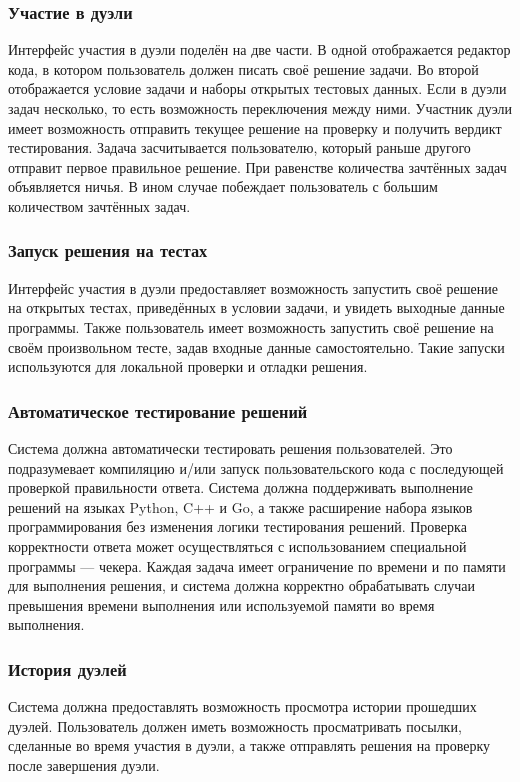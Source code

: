 \subsubsection*{Участие в дуэли}
Интерфейс участия в дуэли поделён на две части.
В одной отображается редактор кода, в котором пользователь должен писать своё решение задачи.
Во второй отображается условие задачи и наборы открытых тестовых данных.
Если в дуэли задач несколько, то есть возможность переключения между ними.
Участник дуэли имеет возможность отправить текущее решение на проверку и получить вердикт тестирования.
Задача засчитывается пользователю, который раньше другого отправит первое правильное решение.
При равенстве количества зачтённых задач объявляется ничья.
В ином случае побеждает пользователь с большим количеством зачтённых задач.

\subsubsection*{Запуск решения на тестах}
Интерфейс участия в дуэли предоставляет возможность запустить своё решение на открытых тестах,
приведённых в условии задачи, и увидеть выходные данные программы.
Также пользователь имеет возможность запустить своё решение на своём произвольном тесте, задав входные данные самостоятельно.
Такие запуски используются для локальной проверки и отладки решения.

\subsubsection*{Автоматическое тестирование решений}
Система должна автоматически тестировать решения пользователей.
Это подразумевает компиляцию и/или запуск пользовательского кода с последующей проверкой правильности ответа.
Система должна поддерживать выполнение решений на языках Python, C++ и Go,
а также расширение набора языков программирования без изменения логики тестирования решений.
Проверка корректности ответа может осуществляться с использованием специальной программы --- чекера.
Каждая задача имеет ограничение по времени и по памяти для выполнения решения,
и система должна корректно обрабатывать случаи превышения времени выполнения или используемой памяти во время выполнения.

\subsubsection*{История дуэлей}
Система должна предоставлять возможность просмотра истории прошедших дуэлей.
Пользователь должен иметь возможность просматривать посылки, сделанные во время участия в дуэли,
а также отправлять решения на проверку после завершения дуэли.

